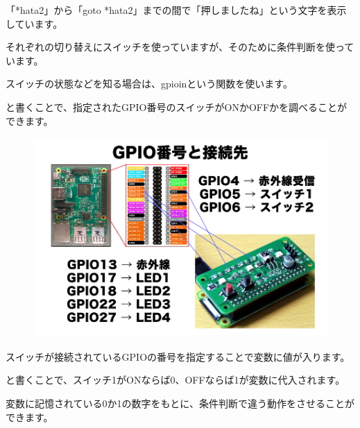 「*hata2」から「goto *hata2」までの間で「押しましたね」という文字を表示しています。

それぞれの切り替えにスイッチを使っていますが、そのために条件判断を使っています。

スイッチの状態などを知る場合は、gpioinという関数を使います。



\begin{description}
    \item {}
\end{description}

と書くことで、指定されたGPIO番号のスイッチがONかOFFかを調べることができます。



\begin{figure}[H]
    \begin{center}
      \includegraphics[keepaspectratio,width=12.409cm,height=7.62cm]{text04-img/text04-img004.png}
    \end{center}
    \label{fig:prog_menu}
\end{figure}



スイッチが接続されているGPIOの番号を指定することで変数に値が入ります。


\begin{description}
    \item {}
\end{description}



と書くことで、スイッチ1がONならば0、OFFならば1が変数に代入されます。

変数に記憶されている0か1の数字をもとに、条件判断で違う動作をさせることができます。


